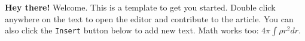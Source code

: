\textbf{Hey there!} Welcome. This is a template to get you started. Double click anywhere on the text to open the editor and contribute to the article. You can also click the \verb|Insert| button below to add new text. Math works too: $4 \pi \int \rho r^2 dr$.